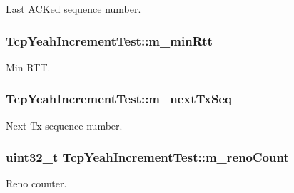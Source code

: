 Last A\+C\+Ked sequence number. 

\subsubsection[{\texorpdfstring{m\+\_\+min\+Rtt}{m_minRtt}}]{ Tcp\+Yeah\+Increment\+Test\+::m\+\_\+min\+Rtt\hspace{0.3cm}{\ttfamily [private]}}\hypertarget{classTcpYeahIncrementTest_adc856d8e85a4fe25a0445228fe98f2d5}{}\label{classTcpYeahIncrementTest_adc856d8e85a4fe25a0445228fe98f2d5}


Min R\+TT. 

\subsubsection[{\texorpdfstring{m\+\_\+next\+Tx\+Seq}{m_nextTxSeq}}]{ Tcp\+Yeah\+Increment\+Test\+::m\+\_\+next\+Tx\+Seq\hspace{0.3cm}{\ttfamily [private]}}\hypertarget{classTcpYeahIncrementTest_a836b1008465881036eb4f1f15e16b72a}{}\label{classTcpYeahIncrementTest_a836b1008465881036eb4f1f15e16b72a}


Next Tx sequence number. 

\subsubsection[{\texorpdfstring{m\+\_\+reno\+Count}{m_renoCount}}]{\setlength{\rightskip}{0pt plus 5cm}uint32\+\_\+t Tcp\+Yeah\+Increment\+Test\+::m\+\_\+reno\+Count\hspace{0.3cm}{\ttfamily [private]}}\hypertarget{classTcpYeahIncrementTest_abef7ecc57097eb21573a3efdd133229c}{}\label{classTcpYeahIncrementTest_abef7ecc57097eb21573a3efdd133229c}


Reno counter. 

